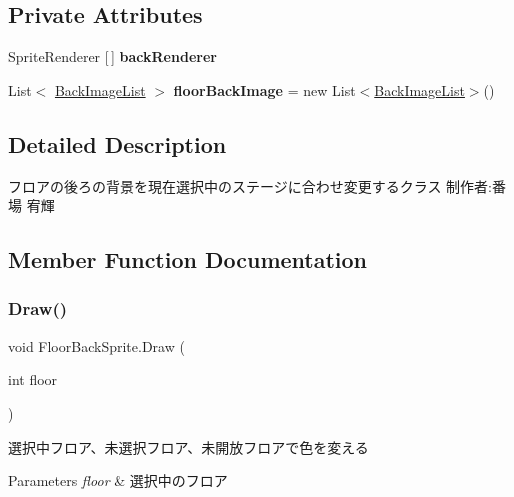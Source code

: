 \subsection*{Private Attributes}
\begin{DoxyCompactItemize}
\item 
\mbox{\label{class_floor_back_sprite_adbb6e47e74565b39113f8c68d5d4918a}} 
Sprite\+Renderer \mbox{[}$\,$\mbox{]} {\bfseries back\+Renderer}
\item 
\mbox{\label{class_floor_back_sprite_adb983a50493552d8a860bc2dc05a6c87}} 
List$<$ \hyperlink{class_floor_back_sprite_1_1_back_image_list}{Back\+Image\+List} $>$ {\bfseries floor\+Back\+Image} = new List$<$\hyperlink{class_floor_back_sprite_1_1_back_image_list}{Back\+Image\+List}$>$()
\end{DoxyCompactItemize}


\subsection{Detailed Description}
フロアの後ろの背景を現在選択中のステージに合わせ変更するクラス 制作者\+:番場 宥輝 



\subsection{Member Function Documentation}
\mbox{\label{class_floor_back_sprite_a29d03cee121d54e7e74c9cd0f82e9ccc}} 
\subsubsection{\texorpdfstring{Draw()}{Draw()}}
{\footnotesize\ttfamily void Floor\+Back\+Sprite.\+Draw (\begin{DoxyParamCaption}\item[{int}]{floor }\end{DoxyParamCaption})\hspace{0.3cm}{\ttfamily [inline]}}



選択中フロア、未選択フロア、未開放フロアで色を変える 


\begin{DoxyParams}{Parameters}
{\em floor} & 選択中のフロア\\
\hline
\end{DoxyParams}
\mbox{\label{class_floor_back_sprite_addb7861cc28c88efde4b652023a671ef}} 
